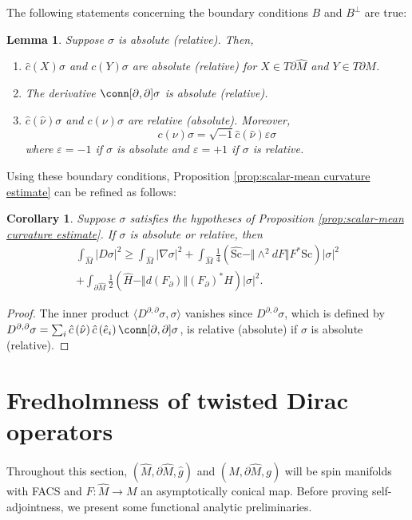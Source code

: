 \documentclass[12pt, reqno]{amsart}
\theoremstyle{plain} %
\newtheorem{lemma}[theorem]{Lemma}
\newtheorem{corollary}[theorem]{Corollary}
\theoremstyle{definition}
\theoremstyle{remark}
\numberwithin{equation}{section}
\newcommand{\dom}[1]{\hat{#1}}
\newcommand{\onorm}[1]{\Vert #1 \Vert}
\newcommand{\pnorm}[1]{| #1 |}
\newcommand{\bnd}[1]{\partial #1}
\newcommand{\cbar}[1]{\dom{c}\left(#1\right)}
\newcommand{\Sc}{\mathrm{Sc}}
\newcommand{\inner}[1]{\langle #1 \rangle}
\begin{document}
The following statements concerning the boundary conditions \(B\) and \(B^{\perp}\) are true:
\begin{lemma}
    Suppose \(\sigma\) is absolute (relative).
    Then,
    \begin{enumerate}
        \item \(\cbar{X} \sigma\) and \(c(Y) \sigma\) are absolute (relative)  for \(X \in T\bnd{\dom{M}}\) and \(Y \in T\bnd{M}\).
        \item The derivative \(\conn[\partial, \partial] \sigma\) is absolute (relative).
        \item \(\cbar{\dom{\nu}} \sigma\) and \(c(\nu) \sigma\) are relative (absolute). Moreover,
        \begin{equation*}
            c(\nu) \sigma = \sqrt{-1} \cbar{\dom{\nu}} \varepsilon\sigma
        \end{equation*}
        where \(\varepsilon = -1\) if \(\sigma\) is absolute and \(\varepsilon = +1\) if \(\sigma\) is relative.
    \end{enumerate}
\end{lemma}
Using these boundary conditions, Proposition \ref{prop:scalar-mean curvature estimate} can be refined as follows:
\begin{corollary}\label{cor:scalar-mean curvature estimate with boundary condition}
    Suppose \(\sigma\) satisfies the hypotheses of Proposition \ref{prop:scalar-mean curvature estimate}.
    If \(\sigma\) is absolute or relative, then
    \begin{multline}\label{eqn:scalar-mean curvature estimate with boundary condition}
        \int_{\dom{M}}\pnorm{D\sigma}^2\geq \int_{\dom{M}}\pnorm{\nabla \sigma}^2+\int_{\dom{M}} \frac{1}{4}(\dom{\Sc}-\onorm{\wedge^2dF}F^*\Sc )\pnorm{\sigma}^2\\
        + \int_{\bnd{\dom{M}}} \frac{1}{2} (\dom{H} - \onorm{d(F_\partial)} (F_\partial)^*H )\pnorm{\sigma}^2.
    \end{multline}
\end{corollary}
\begin{proof}
    The inner product \(\inner{D^{\partial, \partial} \sigma, \sigma}\) vanishes since \(D^{\partial, \partial} \sigma\), which is defined by \(D^{\partial, \partial} \sigma = \sum_i \cbar{\dom{\nu}} \cbar{\dom{e}_i} \conn[\partial, \partial] \sigma\), is relative (absolute) if \(\sigma\) is absolute (relative).
\end{proof}

\section{Fredholmness of twisted Dirac operators}\label{sec:fredholmness}
Throughout this section, \((\dom{M}, \bnd{\dom{M}},\dom{g})\) and \((M, \bnd{\dom{M}},g)\) will be spin manifolds with FACS and \(F \colon \dom{M}\to M\) an asymptotically conical map.
Before proving self-adjointness, we present some functional analytic preliminaries.
\end{document}
